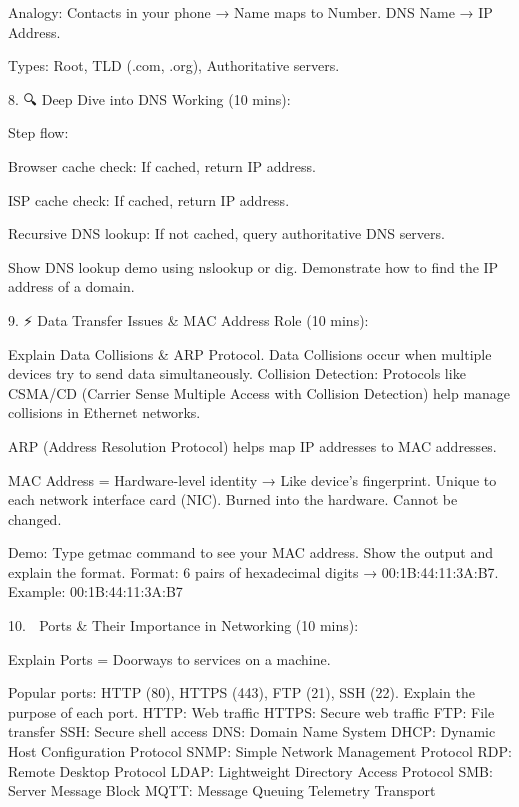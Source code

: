         Analogy: Contacts in your phone → Name maps to Number.
            DNS Name → IP Address.


        Types: Root, TLD (.com, .org), Authoritative servers.




    8. 🔍 Deep Dive into DNS Working (10 mins):

        Step flow:

        Browser cache check:
            If cached, return IP address.

        ISP cache check:
            If cached, return IP address.

        Recursive DNS lookup:
            If not cached, query authoritative DNS servers.

        Show DNS lookup demo using nslookup or dig.
            Demonstrate how to find the IP address of a domain.

    9. ⚡ Data Transfer Issues & MAC Address Role (10 mins):


        Explain Data Collisions & ARP Protocol.
            Data Collisions occur when multiple devices try to send data simultaneously.
                Collision Detection: Protocols like CSMA/CD (Carrier Sense Multiple Access with Collision Detection) help manage collisions in Ethernet networks.
            
            ARP (Address Resolution Protocol) helps map IP addresses to MAC addresses.

    
        MAC Address = Hardware-level identity → Like device’s fingerprint.
            Unique to each network interface card (NIC).
            Burned into the hardware.
            Cannot be changed.


        Demo: Type getmac command to see your MAC address.
            Show the output and explain the format.
            Format: 6 pairs of hexadecimal digits → 00:1B:44:11:3A:B7.
            Example: 00:1B:44:11:3A:B7



    10. 🔢 Ports & Their Importance in Networking (10 mins):


        Explain Ports = Doorways to services on a machine.

        Popular ports: HTTP (80), HTTPS (443), FTP (21), SSH (22).
            Explain the purpose of each port.
                HTTP: Web traffic
                HTTPS: Secure web traffic
                FTP: File transfer
                SSH: Secure shell access
                DNS: Domain Name System
                DHCP: Dynamic Host Configuration Protocol
                SNMP: Simple Network Management Protocol
                RDP: Remote Desktop Protocol
                LDAP: Lightweight Directory Access Protocol
                SMB: Server Message Block
                MQTT: Message Queuing Telemetry Transport
                    


